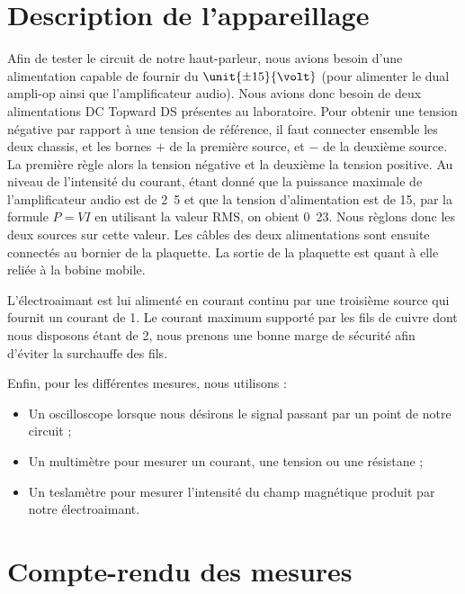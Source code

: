 

\section{Description de l'appareillage}
Afin de tester le circuit de notre haut-parleur, nous avions besoin d'une alimentation
capable de fournir du $\unit{\pm 15}{\volt}$ (pour alimenter le dual ampli-op ainsi
que l'amplificateur audio). Nous avions donc besoin de deux alimentations DC Topward 
 DS présentes au laboratoire. Pour obtenir une tension négative par 
rapport à une tension de référence, il faut connecter ensemble les deux chassis,
et les bornes $+$ de la première source, et $-$ de la deuxième source. La première règle
alors la tension négative et la deuxième la tension positive\cite{dctopward}.
Au niveau de l'intensité du courant, étant donné que la puissance maximale de l'amplificateur
audio est de \unit{2.5}{\watt}\cite{datasheetampli} et que la tension d'alimentation est de \unit{15}{\volt}, par
la formule $P = VI$ en utilisant la valeur RMS, on obient \unit{0.23}{\ampere}. Nous règlons
donc les deux sources sur cette valeur. Les câbles des deux alimentations sont ensuite connectés 
au bornier de la plaquette. La sortie de la plaquette est quant à elle reliée à la bobine mobile.

L'électroaimant est lui alimenté en courant continu par une troisième source qui 
fournit un courant de \unit{1}{\ampere}. Le courant maximum supporté par les fils de 
cuivre dont nous disposons étant de \unit{2}{\ampere}\cite{norme-cuivre}, nous prenons
une bonne marge de sécurité afin d'éviter la surchauffe des fils.

Enfin, pour les différentes mesures, nous utilisons :

\begin{itemize}
	\item Un oscilloscope lorsque nous désirons le signal passant par un point de notre circuit ;
	\item Un multimètre pour mesurer un courant, une tension ou une résistane ;
	\item Un teslamètre pour mesurer l'intensité du champ magnétique produit par notre électroaimant.
\end{itemize}

\section{Compte-rendu des mesures}

